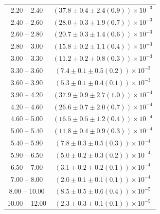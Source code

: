 \begin{table}
\begin{center}
\begin{tabular}{ c | c }
2.20 -- 2.40 & $(37.8\pm0.4\pm2.4(0.9))\times10^{-3}$ \\ 
2.40 -- 2.60 & $(28.0\pm0.3\pm1.9(0.7))\times10^{-3}$ \\ 
2.60 -- 2.80 & $(20.7\pm0.3\pm1.4(0.6))\times10^{-3}$ \\ 
2.80 -- 3.00 & $(15.8\pm0.2\pm1.1(0.4))\times10^{-3}$ \\ 
3.00 -- 3.30 & $(11.2\pm0.2\pm0.8(0.3))\times10^{-3}$ \\ 
3.30 -- 3.60 & $(7.4\pm0.1\pm0.5(0.2))\times10^{-3}$ \\ 
3.60 -- 3.90 & $(5.3\pm0.1\pm0.4(0.1))\times10^{-3}$ \\ 
3.90 -- 4.20 & $(37.9\pm0.9\pm2.7(1.0))\times10^{-4}$ \\ 
4.20 -- 4.60 & $(26.6\pm0.7\pm2.0(0.7))\times10^{-4}$ \\ 
4.60 -- 5.00 & $(16.5\pm0.5\pm1.2(0.4))\times10^{-4}$ \\ 
5.00 -- 5.40 & $(11.8\pm0.4\pm0.9(0.3))\times10^{-4}$ \\ 
5.40 -- 5.90 & $(7.8\pm0.3\pm0.5(0.3))\times10^{-4}$ \\ 
5.90 -- 6.50 & $(5.0\pm0.2\pm0.3(0.2))\times10^{-4}$ \\ 
6.50 -- 7.00 & $(3.1\pm0.2\pm0.2(0.1))\times10^{-4}$ \\ 
7.00 -- 8.00 & $(2.0\pm0.1\pm0.1(0.1))\times10^{-4}$ \\ 
8.00 -- 10.00 & $(8.5\pm0.5\pm0.6(0.4))\times10^{-5}$ \\ 
10.00 -- 12.00 & $(2.3\pm0.3\pm0.1(0.1))\times10^{-5}$ \\ 
\hline
\end{tabular}
\end{center}
\end{table}
 
